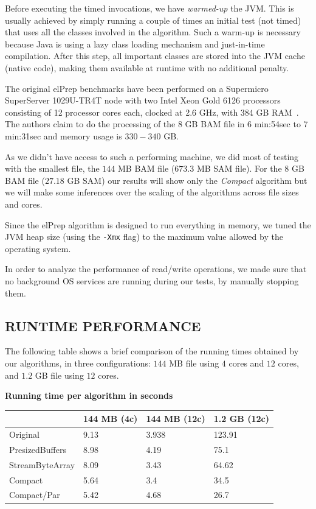 \documentclass[a4paper,twoside]{article}
\begin{document}
{Before executing the timed invocations, we have {\textit{warmed-up}} the JVM\@.
This is usually achieved by simply running a couple of times an initial test (not timed) that uses all the classes involved in the algorithm.
Such a warm-up is necessary because Java is using a lazy class loading mechanism and just-in-time compilation.
After this step, all important classes are stored into the JVM cache (native code), making them available at runtime with no additional penalty.

The original elPrep benchmarks have been performed on a Supermicro SuperServer 1029U-TR4T node with two
Intel Xeon Gold 6126 processors consisting of 12 processor cores each, clocked at 2.6 GHz, with 384 GB RAM~\cite{costanza:2019}.
The authors claim to do the processing of the 8 GB BAM file in 6 min:54sec to 7 min:31sec and memory usage is $330-340$ GB\@.

As we didn't have access to such a performing machine, we did most of testing with the smallest file, the $144$ MB BAM file ($673.3$ MB SAM file). For the $8$ GB BAM file ($27.18$ GB SAM) our results will show only the {\textit{Compact} } algorithm but we will make some inferences over the scaling of the algorithms across file sizes and cores.

Since the elPrep algorithm is designed to run everything in memory, we tuned the JVM heap size (using the \texttt{-Xmx} flag) to the maximum value allowed by the operating system. 

In order to analyze the performance of read/write operations, we made sure that no background OS services are running during our tests, by manually stopping them.


\subsection{\uppercase{Runtime performance}}
\label{subsec:runtimeperf}

The following table shows a brief comparison of the running times obtained by our algorithms, in three configurations: $144$ MB file using $4$ cores and $12$ cores, and $1.2$ GB file using $12$ cores. 

\begin{small}
\begin{center}
\textbf{Running time per algorithm in seconds} \\
\begin{tabular}{|C{2cm}|C{1.2cm}|C{1.2cm}|C{1.2cm}|}
\hline
						& 144 MB (4c)	& 144 MB (12c)		& 1.2 GB (12c)	\\ \hline
Original				& 9.13 			& 3.938 			& 123.91 		\\ \hline
PresizedBuffers			& 8.98 			& 4.19 				& 75.1 			\\ \hline
StreamByteArray			& 8.09 			& 3.43 				& 64.62 		\\ \hline
Compact 				& 5.64 			& 3.4 	 			& 34.5			\\ \hline
Compact/Par 			& 5.42		    & 4.68				& 26.7 			\\ \hline
\end{tabular}
\end{center}
\end{small}

}
\end{document}
